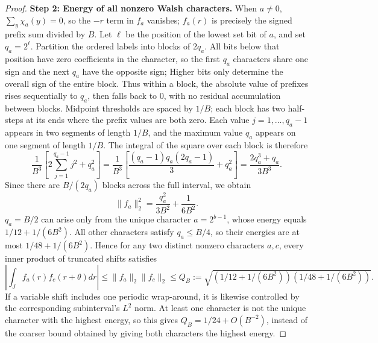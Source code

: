 \documentclass[a4paper,11pt]{article}
\theoremstyle{remark}
\begin{document}
\begin{proof}
\textbf{Step 2: Energy of all nonzero Walsh characters.}
When $a\ne0$, $\sum_y\chi_a(y)=0$, so the $-r$ term in $f_a$ vanishes;
$f_a(r)$ is precisely the signed prefix sum divided by $B$.
Let $\ell$ be the position of the lowest set bit of $a$, and set $q_a=2^\ell$.
Partition the ordered labels into blocks of $2q_a$. All bits below that position have zero coefficients in the character,
so the first $q_a$ characters share one sign and the next $q_a$ have the opposite sign;
Higher bits only determine the overall sign of the entire block. Thus within a block, the absolute value of prefixes rises sequentially to
$q_a$, then falls back to 0, with no residual accumulation between blocks.
Midpoint thresholds are spaced by $1/B$; each block has two half-steps at its ends where the prefix values are both zero.
Each value $j=1,\ldots,q_a-1$ appears in two segments of length $1/B$, and the maximum value $q_a$
appears on one segment of length $1/B$. The integral of the square over each block is therefore
\[
 \frac1{B^3}\left[2\sum_{j=1}^{q_a-1}j^2+q_a^2\right]
 =\frac1{B^3}\left[\frac{(q_a-1)q_a(2q_a-1)}3+q_a^2\right]
 =\frac{2q_a^3+q_a}{3B^3}.
\]
Since there are $B/(2q_a)$ blocks across the full interval, we obtain
\begin{equation}\label{eq:paperwalshenergy}
 \|f_a\|_2^2=\frac{q_a^2}{3B^2}+\frac1{6B^2}.
\end{equation}
$q_a=B/2$ can arise only from the unique character $a=2^{b-1}$, whose energy equals
$1/12+1/(6B^2)$. All other characters satisfy $q_a\le B/4$, so their energies are at most
$1/48+1/(6B^2)$.
Hence for any two distinct nonzero characters $a,c$, every inner product of truncated shifts satisfies
\[
 |\int_J f_a(r)f_c(r+\theta)dr|
 \le\|f_a\|_2\|f_c\|_2
 \le Q_B:=\sqrt{(1/12+1/(6B^2))(1/48+1/(6B^2))}.
\]
If a variable shift includes one periodic wrap-around, it is likewise controlled by the corresponding subinterval's $L^2$ norm.
At least one character is not the unique character with the highest energy, so this gives $Q_B=1/24+O(B^{-2})$,
instead of the coarser bound obtained by giving both characters the highest energy.


\end{proof}
\end{document}
